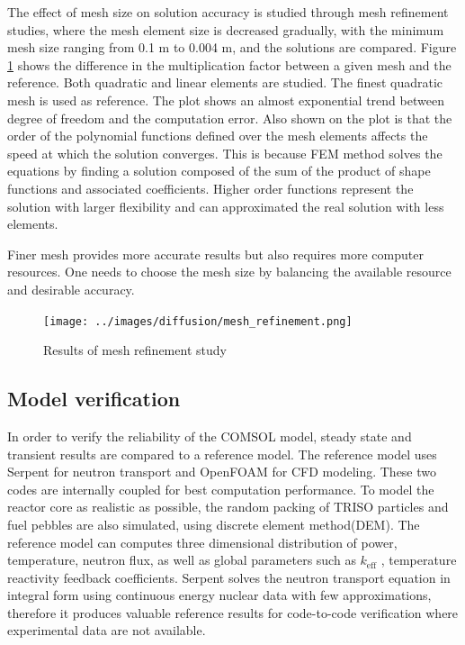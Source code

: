 \documentclass{elsarticle}
\newcommand{\keff}{{\ensuremath{k_{\mathrm{eff}}}} }
\begin{document}
The effect of mesh size on solution accuracy is studied through mesh refinement studies, where the mesh element size is decreased gradually, with the minimum mesh size ranging from 0.1 m to 0.004 m, and the solutions are compared. 
Figure \ref{fig:mesh_refinement} shows the difference in the multiplication factor between a given mesh and the reference. Both quadratic and linear elements are studied. The finest quadratic mesh is used as reference. The plot shows an almost exponential trend between degree of freedom and the computation error. 
Also shown on the plot is that the order of the polynomial functions defined over the mesh elements affects the speed at which the solution converges. This is because FEM method solves the equations by finding a solution composed of the sum of the product of shape functions and associated coefficients. Higher order functions represent the solution with larger flexibility and can approximated the real solution with less elements. 
 
Finer mesh provides more accurate results but also requires more computer resources. One needs to choose the mesh size by balancing the available resource and desirable accuracy. 

\begin{figure}[ht]
  \centering
  \texttt{[image: ../images/diffusion/mesh\_refinement.png]}
  \caption{Results of mesh refinement study}
  \label{fig:mesh_refinement}
\end{figure}





\subsection{Model verification}
In order to verify the reliability of the COMSOL model, steady state and transient results are compared to a reference model. The reference model\cite{Aufiero2016} uses Serpent for neutron transport and OpenFOAM for CFD modeling. These two codes are internally coupled for best computation performance. To model the reactor core as realistic as possible, the random packing of TRISO particles and fuel pebbles are also simulated, using discrete element method(DEM). The reference model can computes three dimensional distribution of power, temperature, neutron flux, as well as global parameters such as \keff, temperature reactivity feedback coefficients. 
Serpent solves the neutron transport equation in integral form using continuous energy nuclear data with few approximations, therefore it produces valuable reference results for code-to-code verification where experimental data are not available. 
\end{document}
